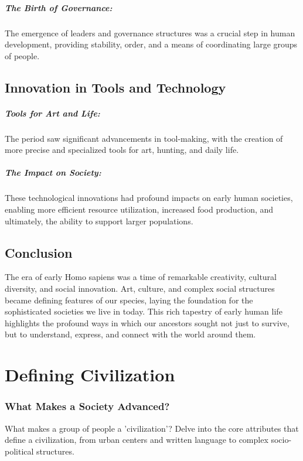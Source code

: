 \documentclass[a4paper,12pt]{book}
\begin{document}
\paragraph{The Birth of Governance:}
The emergence of leaders and governance structures was a crucial step in human development, providing stability, order, and a means of coordinating large groups of people.

\section*{Innovation in Tools and Technology}

\paragraph{Tools for Art and Life:}
The period saw significant advancements in tool-making, with the creation of more precise and specialized tools for art, hunting, and daily life.

\paragraph{The Impact on Society:}
These technological innovations had profound impacts on early human societies, enabling more efficient resource utilization, increased food production, and ultimately, the ability to support larger populations.

\section*{Conclusion}

The era of early Homo sapiens was a time of remarkable creativity, cultural diversity, and social innovation. Art, culture, and complex social structures became defining features of our species, laying the foundation for the sophisticated societies we live in today. This rich tapestry of early human life highlights the profound ways in which our ancestors sought not just to survive, but to understand, express, and connect with the world around them.

\chapter{Defining Civilization}
\subsection*{What Makes a Society Advanced?}
What makes a group of people a 'civilization'? Delve into the core attributes that define a civilization, from urban centers and written language to complex socio-political structures.
\end{document}
